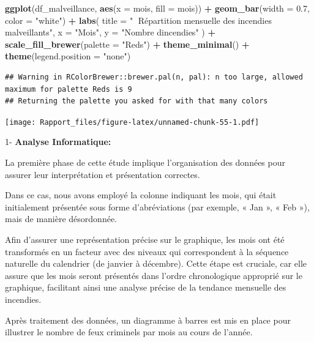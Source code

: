 \documentclass[
]{article}
\newenvironment{Shaded}{\begin{snugshade}}{\end{snugshade}}
\newcommand{\AttributeTok}[1]{\textcolor[rgb]{0.13,0.29,0.53}{#1}}
\newcommand{\FloatTok}[1]{\textcolor[rgb]{0.00,0.00,0.81}{#1}}
\newcommand{\FunctionTok}[1]{\textcolor[rgb]{0.13,0.29,0.53}{\textbf{#1}}}
\newcommand{\NormalTok}[1]{#1}
\newcommand{\SpecialCharTok}[1]{\textcolor[rgb]{0.81,0.36,0.00}{\textbf{#1}}}
\newcommand{\StringTok}[1]{\textcolor[rgb]{0.31,0.60,0.02}{#1}}
\begin{document}
\begin{Shaded}
\begin{Highlighting}[]
\FunctionTok{ggplot}\NormalTok{(df\_malveillance, }\FunctionTok{aes}\NormalTok{(}\AttributeTok{x =}\NormalTok{ mois, }\AttributeTok{fill =}\NormalTok{ mois)) }\SpecialCharTok{+}
  \FunctionTok{geom\_bar}\NormalTok{(}\AttributeTok{width =} \FloatTok{0.7}\NormalTok{, }\AttributeTok{color =} \StringTok{"white"}\NormalTok{) }\SpecialCharTok{+}
  \FunctionTok{labs}\NormalTok{(}
    \AttributeTok{title =} \StringTok{"📆 Répartition mensuelle des incendies malveillants"}\NormalTok{,}
    \AttributeTok{x =} \StringTok{"Mois"}\NormalTok{,}
    \AttributeTok{y =} \StringTok{"Nombre d\textquotesingle{}incendies"}
\NormalTok{  ) }\SpecialCharTok{+}
  \FunctionTok{scale\_fill\_brewer}\NormalTok{(}\AttributeTok{palette =} \StringTok{"Reds"}\NormalTok{) }\SpecialCharTok{+}
  \FunctionTok{theme\_minimal}\NormalTok{() }\SpecialCharTok{+}
  \FunctionTok{theme}\NormalTok{(}\AttributeTok{legend.position =} \StringTok{"none"}\NormalTok{)}
\end{Highlighting}
\end{Shaded}

\begin{verbatim}
## Warning in RColorBrewer::brewer.pal(n, pal): n too large, allowed maximum for palette Reds is 9
## Returning the palette you asked for with that many colors
\end{verbatim}

\texttt{[image: Rapport\_files/figure-latex/unnamed-chunk-55-1.pdf]}

1- \textbf{Analyse Informatique:}

La première phase de cette étude implique l'organisation des données
pour assurer leur interprétation et présentation correctes.

Dans ce cas, nous avons employé la colonne indiquant les mois, qui était
initialement présentée sous forme d'abréviations (par exemple, « Jan »,
« Feb »), mais de manière désordonnée.

Afin d'assurer une représentation précise sur le graphique, les mois ont
été transformés en un facteur avec des niveaux qui correspondent à la
séquence naturelle du calendrier (de janvier à décembre). Cette étape
est cruciale, car elle assure que les mois seront présentés dans l'ordre
chronologique approprié sur le graphique, facilitant ainsi une analyse
précise de la tendance mensuelle des incendies.

Après traitement des données, un diagramme à barres est mis en place
pour illustrer le nombre de feux criminels par mois au cours de l'année.
\end{document}
